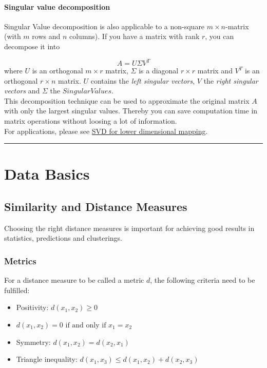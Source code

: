 \documentclass[
]{book}
\begin{document}
\hypertarget{SVD1}{%
\subsubsection{Singular value decomposition}\label{SVD1}}

Singular Value decomposition is also applicable to a non-square
\(m \times n\)-matrix (with \(m\) rows and \(n\) columns). If you have a
matrix with rank \(r\), you can decompose it into

\[
A = U \Sigma V^T
\] where \(U\) is an orthogonal \(m \times r\) matrix, \(\Sigma\) is a
diagonal \(r \times r\) matrix and \(V^T\) is an orthogonal \(r \times n\)
matrix. \(U\) contains the \emph{left singular vectors}, \(V\) the \emph{right
singular vectors} and \(\Sigma\) the \(Singular Values\).\\
This decomposition technique can be used to approximate the original
matrix \(A\) with only the largest singular values. Thereby you can save
computation time in matrix operations without loosing a lot of
information.\\
For applications, please see \protect\hyperlink{SVD2}{SVD for lower dimensional mapping}.

\begin{center}\rule{0.5\linewidth}{0.5pt}\end{center}

\hypertarget{data-basics}{%
\chapter{Data Basics}\label{data-basics}}

\hypertarget{similarity-and-distance-measures}{%
\section{Similarity and Distance Measures}\label{similarity-and-distance-measures}}

Choosing the right distance measures is important for achieving good
results in statistics, predictions and clusterings.

\hypertarget{metrics}{%
\subsection{Metrics}\label{metrics}}

For a distance measure to be called a metric \(d\), the following criteria
need to be fulfilled:

\begin{itemize}
\item
  Positivity: \(d(x_1,x_2)≥0\)
\item
  \(d(x_1,x_2)=0 \text{ if and only if } x_1 = x_2\)
\item
  Symmetry: \(d(x_1, x_2) = d(x_2, x_1)\)
\item
  Triangle inequality: \(d(x_1, x_3) ≤ d(x_1, x_2) + d(x_2, x_3)\)
\end{itemize}
\end{document}
